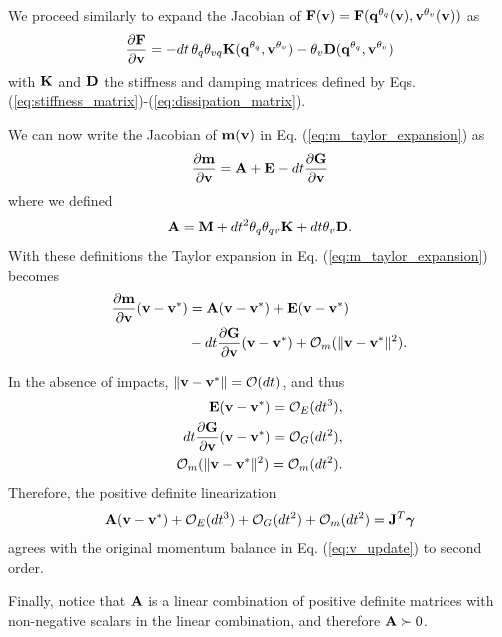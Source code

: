 \begin{IEEEproof}
We proceed similarly to expand the Jacobian of
${\mathbf{F}}({\mathbf{v}})={\mathbf{F}}({\mathbf{q}}^{\theta_{q}}({\mathbf{v}}), {\mathbf{v}}^{\theta_v}({\mathbf{v}}))$
as
\begin{align*}
	\frac{\partial{\mathbf{F}}}{\partial {\mathbf{v}}} = -dt\,\theta_q\theta_{vq}{\mathbf{K}}({\mathbf{q}}^{\theta_q},
	{\mathbf{v}}^{\theta_v})-\theta_v{\mathbf{D}}({\mathbf{q}}^{\theta_q}, {\mathbf{v}}^{\theta_v})
\end{align*}
with ${\mathbf{K}}$ and ${\mathbf{D}}$ the stiffness and damping matrices defined by Eqs.
(\ref{eq:stiffness_matrix})-(\ref{eq:dissipation_matrix}).

We can now write the Jacobian of ${\mathbf{m}}({\mathbf{v}})$ in Eq.
(\ref{eq:m_taylor_expansion}) as
\begin{align*}
	\frac{\partial {\mathbf{m}}}{\partial {\mathbf{v}}} = {\mathbf{A}} + {\mathbf{E}} - dt\frac{\partial {\mathbf{G}}}{\partial {\mathbf{v}}}
\end{align*}
where we defined
\begin{align*}
	{\mathbf{A}}={\mathbf{M}}+ dt^2\theta_q\theta_{qv}{\mathbf{K}}+dt\theta_v{\mathbf{D}}.
\end{align*}
With these definitions the Taylor expansion in Eq. (\ref{eq:m_taylor_expansion})
becomes
\begin{align*}
	\frac{\partial{\mathbf{m}}}{\partial{\mathbf{v}}}({\mathbf{v}}-{\mathbf{v}}^*) &= {\mathbf{A}}({\mathbf{v}}-{\mathbf{v}}^*) + {\mathbf{E}}({\mathbf{v}}-{\mathbf{v}}^*) \\
	&- dt\frac{\partial{\mathbf{G}}}{\partial{\mathbf{v}}}({\mathbf{v}}-{\mathbf{v}}^*) + \mathcal{O}_m(\Vert{\mathbf{v}}-{\mathbf{v}}^*\Vert^2).
\end{align*}

In the absence of impacts, $\Vert{\mathbf{v}}-{\mathbf{v}}^*\Vert=\mathcal{O}(dt)$, and thus
\begin{align*}
	{\mathbf{E}}({\mathbf{v}}-{\mathbf{v}}^*)=\mathcal{O}_E(dt^3), \\
    dt\frac{\partial {\mathbf{G}}}{\partial {\mathbf{v}}}({\mathbf{v}}-{\mathbf{v}}^*)=\mathcal{O}_G(dt^2), \\ 
    \mathcal{O}_m(\Vert{\mathbf{v}}-{\mathbf{v}}^*\Vert^2) = \mathcal{O}_m(dt^2).
\end{align*}
Therefore, the positive definite linearization
\begin{align*}
	{\mathbf{A}}({\mathbf{v}}-{\mathbf{v}}^*) + \mathcal{O}_E(dt^3) + \mathcal{O}_G(dt^2) +
	\mathcal{O}_m(dt^2) = {\mathbf{J}}^T{\mathbf{{\bm\gamma}}}
\end{align*}
agrees with the original momentum balance in Eq. (\ref{eq:v_update}) to second
order.

Finally, notice that ${\mathbf{A}}$ is a linear combination of positive definite
matrices with non-negative scalars in the linear combination, and therefore
${\mathbf{A}}\succ 0$.	
\end{IEEEproof}


